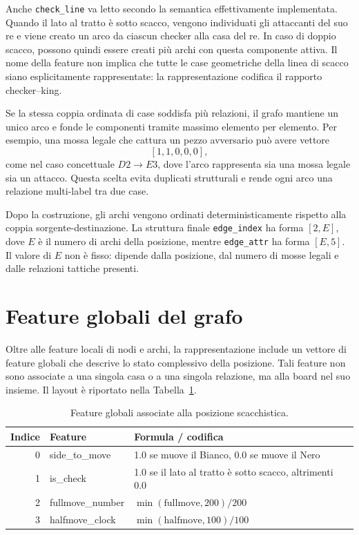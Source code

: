 Anche \texttt{check\_line} va letto secondo la semantica effettivamente implementata. Quando il lato al tratto \`e sotto scacco, vengono individuati gli attaccanti del suo re e viene creato un arco da ciascun checker alla casa del re. In caso di doppio scacco, possono quindi essere creati pi\`u archi con questa componente attiva. Il nome della feature non implica che tutte le case geometriche della linea di scacco siano esplicitamente rappresentate: la rappresentazione codifica il rapporto checker--king.

Se la stessa coppia ordinata di case soddisfa pi\`u relazioni, il grafo mantiene un unico arco e fonde le componenti tramite massimo elemento per elemento. Per esempio, una mossa legale che cattura un pezzo avversario pu\`o avere vettore
\[
    [1, 1, 0, 0, 0],
\]
come nel caso concettuale \(D2 \rightarrow E3\), dove l'arco rappresenta sia una mossa legale sia un attacco. Questa scelta evita duplicati strutturali e rende ogni arco una relazione multi-label tra due case.

Dopo la costruzione, gli archi vengono ordinati deterministicamente rispetto alla coppia sorgente-destinazione. La struttura finale \texttt{edge\_index} ha forma \([2,E]\), dove \(E\) \`e il numero di archi della posizione, mentre \texttt{edge\_attr} ha forma \([E,5]\). Il valore di \(E\) non \`e fisso: dipende dalla posizione, dal numero di mosse legali e dalle relazioni tattiche presenti.

\section{Feature globali del grafo}

Oltre alle feature locali di nodi e archi, la rappresentazione include un vettore di feature globali che descrive lo stato complessivo della posizione. Tali feature non sono associate a una singola casa o a una singola relazione, ma alla board nel suo insieme. Il layout \`e riportato nella Tabella~\ref{tab:main-global-features}.

\begin{table}[htbp]
    \centering
    \begin{tabular}{rll}
        \hline
        Indice & Feature & Formula / codifica \\
        \hline
        0 & side\_to\_move & 1.0 se muove il Bianco, 0.0 se muove il Nero \\
        1 & is\_check & 1.0 se il lato al tratto \`e sotto scacco, altrimenti 0.0 \\
        2 & fullmove\_number & \(\min(\mathrm{fullmove}, 200) / 200\) \\
        3 & halfmove\_clock & \(\min(\mathrm{halfmove}, 100) / 100\) \\
        \hline
    \end{tabular}
    \caption{Feature globali associate alla posizione scacchistica.}
    \label{tab:main-global-features}
\end{table}


